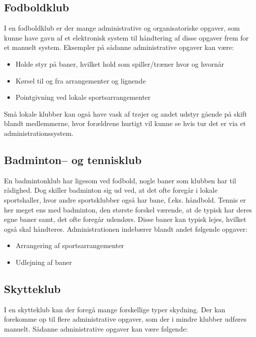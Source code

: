 \subsection{Fodboldklub} \label{Fodbold}

I en fodboldklub er der mange administrative og organisatoriske opgaver, som kunne have gavn af et elektronisk
system til håndtering af disse opgaver frem for et manuelt system. Eksempler på sådanne administrative opgaver
kan være:

\begin{itemize}
  \item Holde styr på baner, hvilket hold som spiller/træner hvor og hvornår
  \item Kørsel til og fra arrangementer og lignende
  \item Pointgivning ved lokale sportsarrangementer
\end{itemize}

Små lokale klubber kan også have vask af trøjer og andet udstyr gående på skift blandt medlemmerne, hvor
forældrene hurtigt vil kunne se hvis tur det er via et administrationssystem.\citep{fodbold1}\citep{fodbold2}


\subsection{Badminton-- og tennisklub}

En badmintonklub har ligesom ved fodbold, nogle baner som klubben har til rådighed. Dog skiller badminton sig
ud ved, at det ofte foregår i lokale sportshaller, hvor andre sportsklubber også har bane, f.eks. håndbold.
Tennis er her meget ens med badminton, den største forskel værende, at de typisk har deres egne baner samt,
det ofte foregår udendørs. Disse baner kan typisk lejes, hvilket også skal håndteres. Administrationen
indebærer blandt andet følgende opgaver:

\begin{itemize}
  \item Arrangering af sportsarrangementer
  \item Udlejning af baner
\end{itemize}


\subsection{Skytteklub}

I en skytteklub kan der foregå mange forskellige typer skydning. Der kan forekomme op til flere administrative
opgaver, som der i mindre klubber udføres manuelt. Sådanne administrative opgaver kan være følgende:

